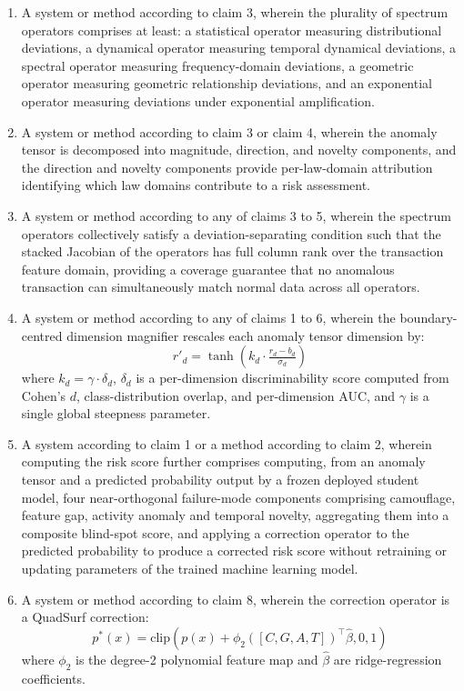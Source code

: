\documentclass[12pt,a4paper]{article}
\begin{document}
\begin{enumerate}[label=\textbf{\arabic*.}]
\item A system or method according to claim 3, wherein the plurality of
spectrum operators comprises at least: a statistical operator measuring
distributional deviations, a dynamical operator measuring temporal dynamical
deviations, a spectral operator measuring frequency-domain deviations, a
geometric operator measuring geometric relationship deviations, and an
exponential operator measuring deviations under exponential amplification.

\item A system or method according to claim 3 or claim 4, wherein the
anomaly tensor is decomposed into magnitude, direction, and novelty
components, and the direction and novelty components provide per-law-domain
attribution identifying which law domains contribute to a risk assessment.

\item A system or method according to any of claims 3 to 5, wherein the
spectrum operators collectively satisfy a deviation-separating condition
such that the stacked Jacobian of the operators has full column rank over
the transaction feature domain, providing a coverage guarantee that no
anomalous transaction can simultaneously match normal data across all
operators.

\item A system or method according to any of claims 1 to 6,
wherein the boundary-centred dimension magnifier rescales each anomaly
tensor dimension by:
\[
r'_d = \tanh\!\left(k_d\cdot\tfrac{r_d-b_d}{\sigma_d}\right)
\]
where $k_d=\gamma\cdot\delta_d$, $\delta_d$ is a per-dimension
discriminability score computed from Cohen's $d$, class-distribution
overlap, and per-dimension AUC, and $\gamma$ is a single global steepness
parameter.

\item A system according to claim 1 or a method according to claim 2,
wherein computing the risk score further comprises computing, from an anomaly
tensor and a predicted probability output by a frozen deployed student model,
four near-orthogonal failure-mode components comprising camouflage, feature
gap, activity anomaly and temporal novelty, aggregating them into a
composite blind-spot score, and applying a correction operator to the
predicted probability to produce a corrected risk score without retraining
or updating parameters of the trained machine learning model.

\item A system or method according to claim 8,
wherein the correction operator is a QuadSurf correction:
\[
p^*(x) = \mathrm{clip}\!\left(p(x)+\phi_2([C,G,A,T])^\top\hat{\beta},0,1\right)
\]
where $\phi_2$ is the degree-2 polynomial feature map and $\hat{\beta}$
are ridge-regression coefficients.


\end{enumerate}
\end{document}
